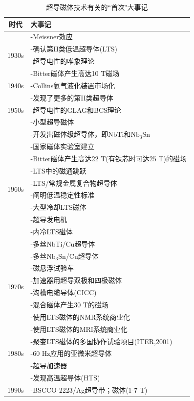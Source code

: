 \begin{table}[htbp]\small
  \centering
  \caption{超导磁体技术有关的``首次"大事记} \label{first event}
\begin{threeparttable}
\begin{tabular}{ |c||l|}
\hline
时代 & 大事记\tnote{*}  \\ \hline
\multirow{4}{*}{1930s} & -Meissner效应 \\
 & -确认第II类低温超导体(LTS)\\
 & -超导电性的唯象理论 \\
 & -Bitter磁体产生高达10 T磁场 \\
 \hline
 1940s & -Collins氦气液化装置市场化\\
 \hline
\multirow{3}{*}{1950s} & -发现了更多的第II类超导体 \\
 & -超导电性的GLAG和BCS理论\\
 & -小型超导磁体 \\
 \hline
 \multirow{10}{*}{1960s} & -开发出磁体级超导体，即NbTi和$\mathrm{Nb_3Sn}$ \\
 & -国家磁体实验室建立\\
 & -Bitter磁体产生高达22 T(有铁芯时可达25 T)的磁场\\
 & -LTS中的磁通跳跃\\
 & -LTS/常规金属复合物超导体\\
 & -阐明低温稳定性标准\\
 & -大型冷却LTS磁体\\
 & -超导发电机\\
 & -内冷LTS磁体\\
 & -多丝NbTi/Cu超导体\\
 \hline
 \multirow{6}{*}{1970s} & -多丝$\mathrm{Nb_3Sn}$/Cu超导体 \\
 & -磁悬浮试验车\\
 & -加速器用超导双极和四极磁体 \\
 & -沟槽电缆导体(CICC)\\
 & -混合磁体产生30 T的磁场\\
 & -使用LTS磁体的NMR系统商业化\\
 \hline
  \multirow{5}{*}{1980s} & -使用LTS磁体的MRI系统商业化 \\
 & -聚变LTS磁体的多国协作试验项目(ITER,2001)\\
 & -60 Hz应用的亚微米超导体\\
 & -超导加速器\\
 & -发现高温超导体(HTS)\\
 \hline
   \multirow{4}{*}{1990s} & -BSCCO-2223/Ag超导带；磁体(1-7 T) \\

\end{tabular}
\end{threeparttable}
\end{table}
